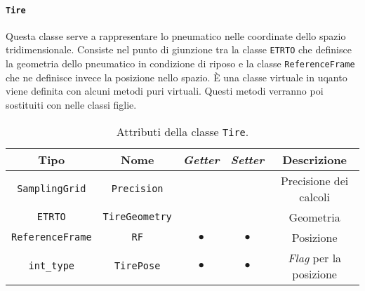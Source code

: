 \paragraph{\texttt{Tire}}
Questa classe serve a rappresentare lo pneumatico nelle coordinate dello spazio tridimensionale. Consiste nel punto di giunzione tra la classe \texttt{ETRTO} che definisce la geometria dello pneumatico in condizione di riposo e la classe \texttt{ReferenceFrame} che ne definisce invece la posizione nello spazio. È una classe virtuale in uqanto viene definita con alcuni metodi puri virtuali. Questi metodi verranno poi sostituiti con nelle classi figlie.
\begin{table}[h!]
	\centering
	\begin{tabular}{|c|c|c|c|c|}
		\hline 
		\textbf{Tipo} & \textbf{Nome} & \textit{\textbf{Getter}} & \textit{\textbf{Setter}} & \textbf{Descrizione} \\ \hline 
		\texttt{SamplingGrid} & \texttt{Precision} & & & Precisione dei calcoli \\ \hline 
		\texttt{ETRTO} & \texttt{TireGeometry} & & & Geometria \\ \hline 
		\texttt{ReferenceFrame} & \texttt{RF} & $\bullet$ & $\bullet$ & Posizione \\ \hline
		\texttt{int\_type} & \texttt{TirePose} & $\bullet$ & $\bullet$ & \textit{Flag} per la posizione \\ \hline
	\end{tabular}
	\caption{Attributi della classe \texttt{Tire}.}
	\label{}
\end{table}
%
